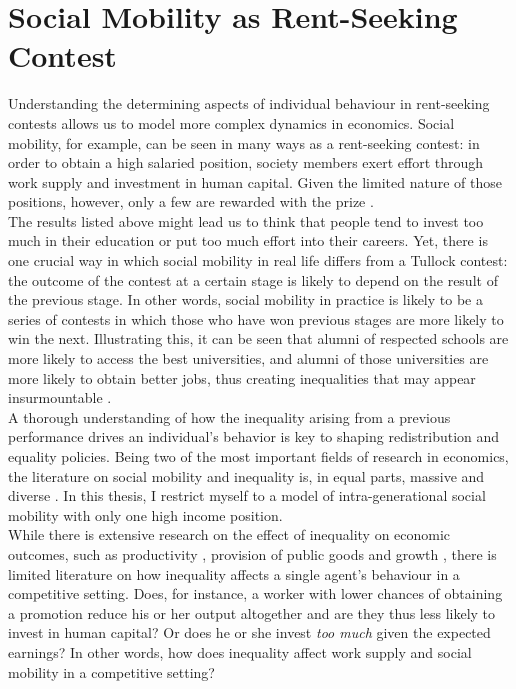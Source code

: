 \section{Social Mobility as Rent-Seeking Contest}
\label{sec:soc_mob}

Understanding the determining aspects of individual behaviour in rent-seeking contests allows us to model more complex dynamics in economics. Social mobility, for example, can be seen in many ways as a rent-seeking contest: in order to obtain a high salaried position, society members exert effort through work supply and investment in human capital. Given the limited nature of those positions, however, only a few are rewarded with the prize \citep{burkhauser2011}.\\

The results listed above might lead us to think that people tend to invest too much in their education or put too much effort into their careers. Yet, there is one crucial way in which social mobility in real life differs from a Tullock contest: the outcome of the contest at a certain stage is likely to depend on the result of the previous stage. In other words, social mobility in practice is likely to be a series of contests in which those who have won previous stages are more likely to win the next. Illustrating this, it can be seen that alumni of respected schools are more likely to access the best universities, and alumni of those universities are more likely to obtain better jobs, thus creating inequalities that may appear insurmountable \citep{sewell1971}.\\

A thorough understanding of how the inequality arising from a previous performance drives an individual's behavior is key to shaping redistribution and equality policies. Being two of the most important fields of research in economics, the literature on social mobility and inequality is, in equal parts, massive and diverse \citep{nolan2011, atkinson2015, lipset2018, fields1999}. In this thesis, I restrict myself to a model of intra-generational social mobility with only one high income position.\\ 

While there is extensive research on the effect of inequality on economic outcomes, such as productivity \citep{persson1994, ku2012}, provision of public goods \citep{fehr1999} and growth \citep{ehrhart2009}, there is limited literature on how inequality affects a single agent's behaviour in a competitive setting. Does, for instance, a worker with lower chances of obtaining a promotion reduce his or her output altogether and are they thus less likely to invest in human capital? Or does he or she invest \textit{too much} given the expected earnings? In other words, how does inequality affect work supply and social mobility in a competitive setting?\\

